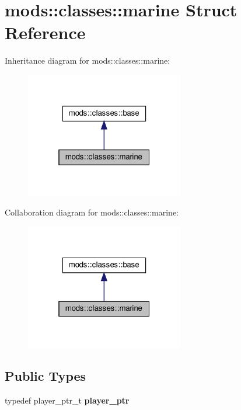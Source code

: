 \hypertarget{structmods_1_1classes_1_1marine}{}\section{mods\+:\+:classes\+:\+:marine Struct Reference}
\label{structmods_1_1classes_1_1marine}


Inheritance diagram for mods\+:\+:classes\+:\+:marine\+:\nopagebreak
\begin{figure}[H]
\begin{center}
\leavevmode
\includegraphics[width=196pt]{structmods_1_1classes_1_1marine__inherit__graph}
\end{center}
\end{figure}


Collaboration diagram for mods\+:\+:classes\+:\+:marine\+:\nopagebreak
\begin{figure}[H]
\begin{center}
\leavevmode
\includegraphics[width=196pt]{structmods_1_1classes_1_1marine__coll__graph}
\end{center}
\end{figure}
\subsection*{Public Types}
\begin{DoxyCompactItemize}
\item 
\mbox{\label{structmods_1_1classes_1_1marine_a08a8ee89c9b9977e1c348b901ba6f722}} 
typedef player\+\_\+ptr\+\_\+t {\bfseries player\+\_\+ptr}
\end{DoxyCompactItemize}
